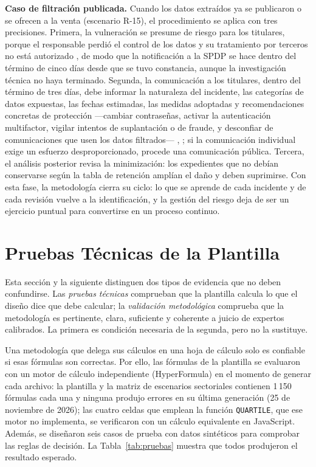 \textbf{Caso de filtración publicada.} Cuando los datos extraídos ya se publicaron o se ofrecen a la venta (escenario R-15), el procedimiento se aplica con tres precisiones. Primera, la vulneración se presume de riesgo para los titulares, porque el responsable perdió el control de los datos y su tratamiento por terceros no está autorizado \cite[art.~24]{rlopdp2023}, de modo que la notificación a la SPDP se hace dentro del término de cinco días desde que se tuvo constancia, aunque la investigación técnica no haya terminado. Segunda, la comunicación a los titulares, dentro del término de tres días, debe informar la naturaleza del incidente, las categorías de datos expuestas, las fechas estimadas, las medidas adoptadas y recomendaciones concretas de protección ---cambiar contraseñas, activar la autenticación multifactor, vigilar intentos de suplantación o de fraude, y desconfiar de comunicaciones que usen los datos filtrados--- \cite[art.~46]{lopdp2021}, \cite{spdp2026vulneraciones}; si la comunicación individual exige un esfuerzo desproporcionado, procede una comunicación pública. Tercera, el análisis posterior revisa la minimización: los expedientes que no debían conservarse según la tabla de retención amplían el daño y deben suprimirse. Con esta fase, la metodología cierra su ciclo: lo que se aprende de cada incidente y de cada revisión vuelve a la identificación, y la gestión del riesgo deja de ser un ejercicio puntual para convertirse en un proceso continuo.


\section{Pruebas Técnicas de la Plantilla}
\label{sec:pruebas_tecnicas}

Esta sección y la siguiente distinguen dos tipos de evidencia que no deben confundirse. Las \textit{pruebas técnicas} comprueban que la plantilla calcula lo que el diseño dice que debe calcular; la \textit{validación metodológica} comprueba que la metodología es pertinente, clara, suficiente y coherente a juicio de expertos calibrados. La primera es condición necesaria de la segunda, pero no la sustituye.


Una metodología que delega sus cálculos en una hoja de cálculo solo es confiable si esas fórmulas son correctas. Por ello, las fórmulas de la plantilla se evaluaron con un motor de cálculo independiente (HyperFormula) en el momento de generar cada archivo: la plantilla y la matriz de escenarios sectoriales contienen 1\,150 fórmulas cada una y ninguna produjo errores en su última generación (25 de noviembre de 2026); las cuatro celdas que emplean la función \texttt{QUARTILE}, que ese motor no implementa, se verificaron con un cálculo equivalente en JavaScript. Además, se diseñaron seis casos de prueba con datos sintéticos para comprobar las reglas de decisión. La Tabla~\ref{tab:pruebas} muestra que todos produjeron el resultado esperado.

